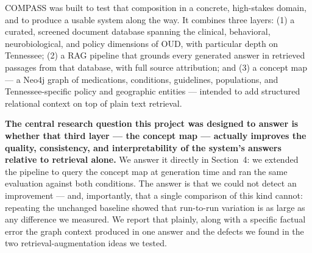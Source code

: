 \documentclass[11pt]{article}
\begin{document}
COMPASS was built to test that composition in a concrete, high-stakes domain, and to produce a usable system along the way. It combines three layers: (1) a curated, screened document database spanning the clinical, behavioral, neurobiological, and policy dimensions of OUD, with particular depth on Tennessee; (2) a RAG pipeline that grounds every generated answer in retrieved passages from that database, with full source attribution; and (3) a concept map --- a Neo4j graph of medications, conditions, guidelines, populations, and Tennessee-specific policy and geographic entities --- intended to add structured relational context on top of plain text retrieval.

\textbf{The central research question this project was designed to answer is whether that third layer --- the concept map --- actually improves the quality, consistency, and interpretability of the system's answers relative to retrieval alone.} We answer it directly in Section~4: we extended the pipeline to query the concept map at generation time and ran the same evaluation against both conditions. The answer is that we could not detect an improvement --- and, importantly, that a single comparison of this kind cannot: repeating the unchanged baseline showed that run-to-run variation is as large as any difference we measured. We report that plainly, along with a specific factual error the graph context produced in one answer and the defects we found in the two retrieval-augmentation ideas we tested.
\end{document}
